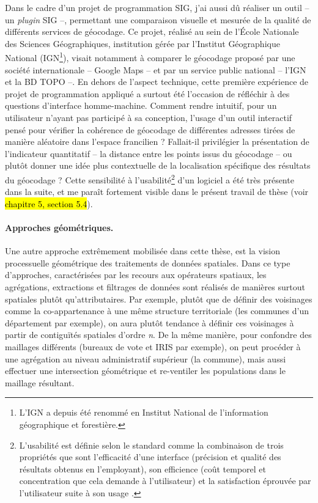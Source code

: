 Dans le cadre d'un projet de programmation SIG, j'ai aussi dû réaliser un outil -- un \textit{plugin} SIG --, permettant une comparaison visuelle et mesurée de la qualité de différents services de géocodage.
Ce projet, réalisé au sein de l'École Nationale des Sciences Géographiques, institution gérée par l'Institut Géographique National (IGN\footnote{
	L'IGN a depuis été renommé en \og Institut National de l'information géographique et forestière\fg{}.
}), visait notamment à comparer le géocodage proposé par une société internationale -- Google Maps -- et par un service public national -- l'IGN et la BD TOPO --.
En dehors de l'aspect technique, cette première expérience de projet de programmation appliqué a surtout été l'occasion de réfléchir à des questions d'interface homme-machine.
Comment rendre intuitif, pour un utilisateur n'ayant pas participé à sa conception, l'usage d'un outil interactif pensé pour vérifier la cohérence de géocodage de différentes adresses tirées de manière aléatoire dans l'espace francilien ?
Fallait-il privilégier la présentation de l'indicateur quantitatif  -- la distance entre les points issus du géocodage -- ou plutôt donner une idée plus contextuelle de la localisation spécifique des résultats du géocodage ?
Cette sensibilité à l'\og usabilité\fg{}\footnote{
	L'usabilité est définie selon le standard \textcite{iso20189241} comme la combinaison de trois propriétés que sont \og l'efficacité\fg{} d'une interface (précision et qualité des résultats obtenus en l'employant), son \og efficience\fg{} (coût temporel et concentration que cela demande à l'utilisateur) et la satisfaction éprouvée par l'utilisateur suite à son usage \autocite[39]{zheng_interactive_2019}.
} d'un logiciel a été très présente dans la suite, et me paraît fortement visible dans le présent travail de thèse (voir \hl{chapitre 5, section 5.4}).

\paragraph{Approches géométriques.}

Une autre approche extrêmement mobilisée dans cette thèse, est la vision processuelle \og géométrique\fg{} des traitements de données spatiales.
Dans ce type d'approches, caractérisées par les recours aux opérateurs spatiaux, les agrégations, extractions et filtrages de données sont réalisés de manières surtout spatiales plutôt qu'attributaires.
Par exemple, plutôt que de définir des voisinages comme la co-appartenance à une même structure territoriale (les communes d'un département par exemple), on aura plutôt tendance à définir ces voisinages à partir de contiguïtés spatiales d'ordre \textit{n}.
De la même manière, pour confondre des maillages différents (bureaux de vote et IRIS par exemple), on peut procéder à une agrégation au niveau administratif supérieur (la commune), mais aussi effectuer une intersection géométrique et re-ventiler les populations dans le maillage résultant.

